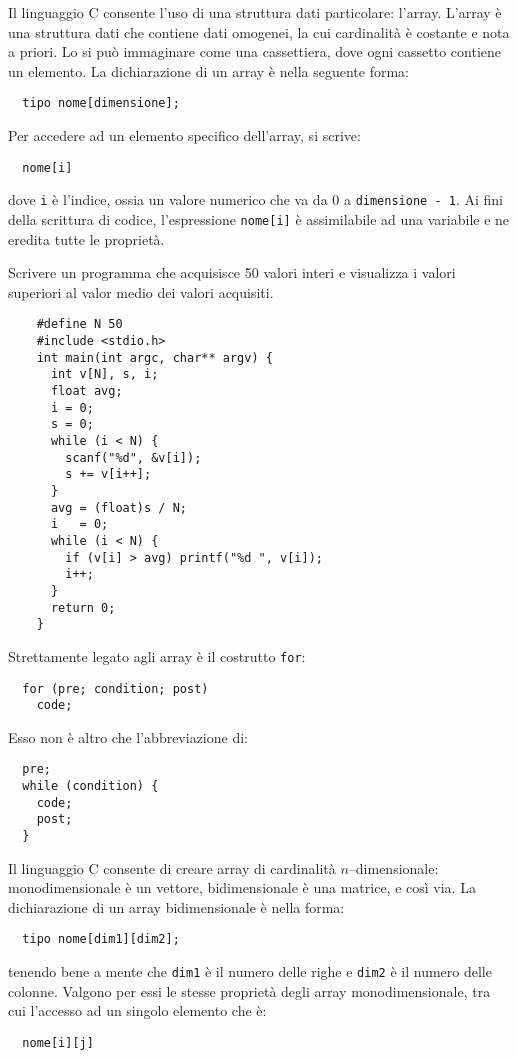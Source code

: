 Il linguaggio C consente l'uso di una struttura dati particolare: l'array. L'array è una struttura dati che contiene dati omogenei, la cui cardinalità è costante e nota a priori. Lo si può immaginare come una cassettiera, dove ogni cassetto contiene un elemento.
La dichiarazione di un array è nella seguente forma:
\begin{verbatim}
  tipo nome[dimensione];
\end{verbatim}
Per accedere ad un elemento specifico dell'array, si scrive:
\begin{verbatim}
  nome[i]
\end{verbatim}
dove \verb|i| è l'indice, ossia un valore numerico che va da 0 a \verb|dimensione - 1|.
Ai fini della scrittura di codice, l'espressione \verb|nome[i]| è assimilabile ad una variabile e ne eredita tutte le proprietà.

\begin{example}
  Scrivere un programma che acquisisce 50 valori interi e visualizza i valori superiori al valor medio dei valori acquisiti.
  \begin{verbatim}
    #define N 50
    #include <stdio.h>
    int main(int argc, char** argv) {
      int v[N], s, i;
      float avg;
      i = 0;
      s = 0;
      while (i < N) {
        scanf("%d", &v[i]);
        s += v[i++];
      }
      avg = (float)s / N;
      i   = 0;
      while (i < N) {
        if (v[i] > avg) printf("%d ", v[i]);
        i++;
      }
      return 0;
    }\end{verbatim}
\end{example}

Strettamente legato agli array è il costrutto \verb|for|:
\begin{verbatim}
  for (pre; condition; post)
    code;
\end{verbatim}
Esso non è altro che l'abbreviazione di:
\begin{verbatim}
  pre;
  while (condition) {
    code;
    post;
  }
\end{verbatim}

Il linguaggio C consente di creare array di cardinalità $n$--dimensionale: monodimensionale è un vettore, bidimensionale è una matrice, e così via.
La dichiarazione di un array bidimensionale è nella forma:
\begin{verbatim}
  tipo nome[dim1][dim2];
\end{verbatim}
tenendo bene a mente che \verb|dim1| è il numero delle righe e \verb|dim2| è il numero delle colonne.
Valgono per essi le stesse proprietà degli array monodimensionale, tra cui l'accesso ad un singolo elemento che è:
\begin{verbatim}
  nome[i][j]
\end{verbatim}

